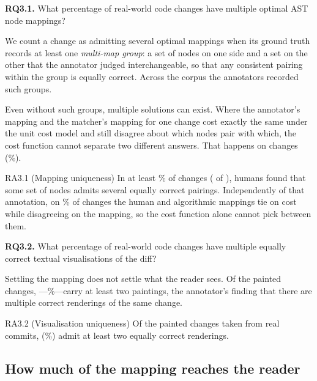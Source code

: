 \documentclass[sigconf]{acmart}
\begin{document}
\textbf{RQ3.1.} What percentage of real-world code changes have multiple optimal AST node
mappings?

We count a change as admitting several optimal mappings when its ground truth records at least one
\emph{multi-map group}: a set of nodes on one side and a set on the other that the annotator judged
interchangeable, so that any consistent pairing within the group is equally correct. Across the corpus the annotators recorded \AmbiguityGroups{} such groups.

Even without such groups, multiple solutions can exist. Where the annotator's mapping and the
matcher's mapping for one change cost exactly the same under the unit cost model and still disagree
about which nodes pair with which, the cost function cannot separate two different answers. That happens on \CostTieDifferentFixtures{} changes (\CostTieDifferentPct{}\%).

\begin{resultbox}{RA3.1 (Mapping uniqueness)}
  In at least \AmbiguityListPct{}\% of changes (\AmbiguityListWith{} of \AmbiguityListScored{}), humans found that some set of nodes admits several equally correct pairings. Independently of that annotation, on
  \CostTieDifferentPct{}\% of changes the human and algorithmic mappings tie on cost while
  disagreeing on the mapping, so the cost function alone cannot pick between them.
\end{resultbox}

\textbf{RQ3.2.} What percentage of real-world code changes have multiple equally correct textual
visualisations of the diff?

Settling the mapping does not settle what the reader sees. Of the \PaintingFixtures{} painted
changes, \PaintingDual{}---\PaintingDualPct{}\%---carry at least two paintings, the annotator's
finding that there are multiple correct renderings of the same change.

\begin{resultbox}{RA3.2 (Visualisation uniqueness)}
Of the \PaintingFixtures{} painted changes taken from real commits, \PaintingDual{} (\PaintingDualPct{}\%) admit at least two equally correct renderings.
\end{resultbox}



\subsection{How much of the mapping reaches the reader}
\end{document}
